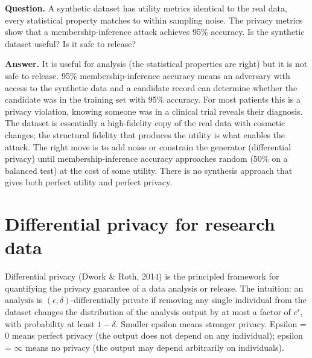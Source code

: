 \documentclass[
  letterpaper,
  11pt]{scrbook}
\begin{document}
\begin{tcolorbox}[enhanced jigsaw, arc=.35mm, bottomrule=.15mm, bottomtitle=1mm, breakable, colback=white, colbacktitle=quarto-callout-note-color!10!white, colframe=quarto-callout-note-color-frame, coltitle=black, left=2mm, leftrule=.75mm, opacityback=0, opacitybacktitle=0.6, rightrule=.15mm, title={Check your understanding: utility without privacy}, titlerule=0mm, toprule=.15mm, toptitle=1mm]

\textbf{Question.} A synthetic dataset has utility metrics identical to
the real data, every statistical property matches to within sampling
noise. The privacy metrics show that a membership-inference attack
achieves 95\% accuracy. Is the synthetic dataset useful? Is it safe to
release?

\textbf{Answer.} It is useful for analysis (the statistical properties
are right) but it is not safe to release. 95\% membership-inference
accuracy means an adversary with access to the synthetic data and a
candidate record can determine whether the candidate was in the training
set with 95\% accuracy. For most patients this is a privacy violation,
knowing someone was in a clinical trial reveals their diagnosis. The
dataset is essentially a high-fidelity copy of the real data with
cosmetic changes; the structural fidelity that produces the utility is
what enables the attack. The right move is to add noise or constrain the
generator (differential privacy) until membership-inference accuracy
approaches random (50\% on a balanced test) at the cost of some utility.
There is no synthesis approach that gives both perfect utility and
perfect privacy.

\end{tcolorbox}

\section{Differential privacy for research
data}\label{differential-privacy-for-research-data}

Differential privacy (Dwork \& Roth, 2014) is the principled framework
for quantifying the privacy guarantee of a data analysis or release. The
intuition: an analysis is \((\epsilon, \delta)\)-differentially private
if removing any single individual from the dataset changes the
distribution of the analysis output by at most a factor of
\(e^\epsilon\), with probability at least \(1 - \delta\). Smaller
epsilon means stronger privacy. Epsilon = 0 means perfect privacy (the
output does not depend on any individual); epsilon = \(\infty\) means no
privacy (the output may depend arbitrarily on individuals).
\end{document}
